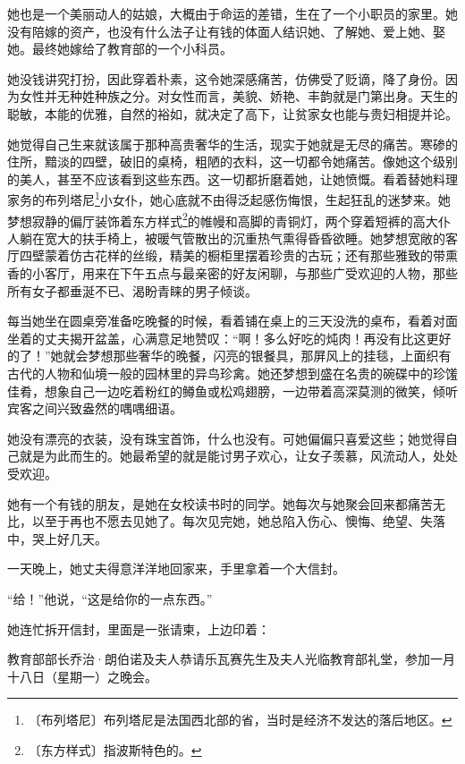 \documentclass[12pt,UTF-8,openany]{ctexbook}
\begin{document}
\begin{large}
    
    她也是一个美丽动人的姑娘，大概由于命运的差错，生在了一个小职员的家里。她没有陪嫁的资产，也没有什么法子让有钱的体面人结识她、了解她、爱上她、娶她。最终她嫁给了教育部的一个小科员。
    
    她没钱讲究打扮，因此穿着朴素，这令她深感痛苦，仿佛受了贬谪，降了身份。因为女性并无种姓种族之分。对女性而言，美貌、娇艳、丰韵就是门第出身。天生的聪敏，本能的优雅，自然的裕如，就决定了高下，让贫家女也能与贵妇相提并论。
    
    她觉得自己生来就该属于那种高贵奢华的生活，现实于她就是无尽的痛苦。寒碜的住所，黯淡的四壁，破旧的桌椅，粗陋的衣料，这一切都令她痛苦。像她这个级别的美人，甚至不应该看到这些东西。这一切都折磨着她，让她愤慨。看着替她料理家务的布列塔尼\footnote{〔布列塔尼〕布列塔尼是法国西北部的省，当时是经济不发达的落后地区。}小女仆，她心底就不由得泛起感伤悔恨，生起狂乱的迷梦来。她梦想寂静的偏厅装饰着东方样式\footnote{〔东方样式〕指波斯特色的。}的帷幔和高脚的青铜灯，两个穿着短裤的高大仆人躺在宽大的扶手椅上，被暖气管散出的沉重热气熏得昏昏欲睡。她梦想宽敞的客厅四壁蒙着仿古花样的丝缎，精美的橱柜里摆着珍贵的古玩；还有那些雅致的带熏香的小客厅，用来在下午五点与最亲密的好友闲聊，与那些广受欢迎的人物，那些所有女子都垂涎不已、渴盼青睐的男子倾谈。
    
    每当她坐在圆桌旁准备吃晚餐的时候，看着铺在桌上的三天没洗的桌布，看着对面坐着的丈夫揭开盆盖，心满意足地赞叹：“啊！多么好吃的炖肉！再没有比这更好的了！”她就会梦想那些奢华的晚餐，闪亮的银餐具，那屏风上的挂毯，上面织有古代的人物和仙境一般的园林里的异鸟珍禽。她还梦想到盛在名贵的碗碟中的珍馐佳肴，想象自己一边吃着粉红的鳟鱼或松鸡翅膀，一边带着高深莫测的微笑，倾听宾客之间兴致盎然的喁喁细语。
    
    她没有漂亮的衣装，没有珠宝首饰，什么也没有。可她偏偏只喜爱这些；她觉得自己就是为此而生的。她最希望的就是能讨男子欢心，让女子羡慕，风流动人，处处受欢迎。
    
    她有一个有钱的朋友，是她在女校读书时的同学。她每次与她聚会回来都痛苦无比，以至于再也不愿去见她了。每次见完她，她总陷入伤心、懊悔、绝望、失落中，哭上好几天。
    
    一天晚上，她丈夫得意洋洋地回家来，手里拿着一个大信封。
    
    “给！”他说，“这是给你的一点东西。”
    
    她连忙拆开信封，里面是一张请柬，上边印着：
    
    教育部部长乔治·朗伯诺及夫人恭请乐瓦赛先生及夫人光临教育部礼堂，参加一月十八日（星期一）之晚会。
    

\end{large}
\end{document}
